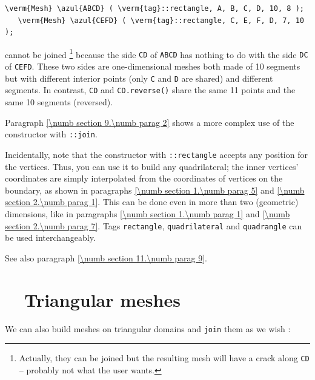 \begin{Verbatim}[commandchars=\\\{\},formatcom=\small\tt,baselinestretch=0.94]
   \verm{Mesh} \azul{ABCD} ( \verm{tag}::rectangle, A, B, C, D, 10, 8 );
   \verm{Mesh} \azul{CEFD} ( \verm{tag}::rectangle, C, E, F, D, 7, 10 );
\end{Verbatim}

\noindent cannot be joined%
\footnote {Actually, they can be joined but the resulting mesh will have
a crack along {\small\tt CD} -- probably not what the user wants.}
because the side {\small\tt CD} of {\small\tt ABCD} has nothing to do with the side 
{\small\tt DC} of {\small\tt CEFD}.
These two sides are one-dimensional meshes both made of 10 segments but with different
interior points (only {\small\tt C} and {\small\tt D} are shared) and different segments.
In contrast, {\small\tt CD} and {\small\tt CD.reverse()} share the same 11 points and
the same 10 segments (reversed).

Paragraph \ref{\numb section 9.\numb parag 2} shows a more complex use of the {\small\tt {}}
constructor with {\small\tt {}::join}.

Incidentally, note that the {\small\tt {}} constructor with {\small\tt {}::rectangle} accepts
any position for the vertices. 
Thus, you can use it to build any quadrilateral; the inner vertices' coordinates are simply
interpolated from the coordinates of vertices on the boundary, as shown in paragraphs
\ref{\numb section 1.\numb parag 5} and \ref{\numb section 2.\numb parag 1}.
This can be done even in more than two (geometric) dimensions, like in
paragraphs \ref{\numb section 1.\numb parag 1} and \ref{\numb section 2.\numb parag 7}.
Tags {\small\tt rectangle}, {\small\tt quadrilateral} and {\small\tt quadrangle} can be used
interchangeably.

See also paragraph \ref{\numb section 11.\numb parag 9}.


\section{~~Triangular meshes}\label{\numb section 1.\numb parag 4}

We can also build meshes on triangular domains and {\small\tt join} them as we wish :

